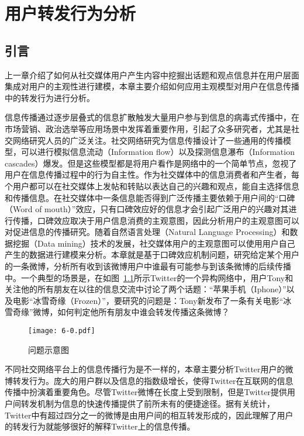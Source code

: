 \chapter{用户转发行为分析}
\label{ch6}

\section{引言}
\label{ch6_intro}
上一章介绍了如何从社交媒体用户产生内容中挖掘出话题和观点信息并在用户层面集成对用户的主观性进行建模，本章主要介绍如何应用主观模型对用户在信息传播中的转发行为进行分析。

信息传播通过逐步层叠式的信息扩散触发大量用户参与到信息的病毒式传播中，在市场营销、政治选举等应用场景中发挥着重要作用，引起了众多研究者，尤其是社交网络研究人员的广泛关注。社交网络研究为信息传播设计了一些通用的传播模型，可以进行模拟信息流动（Information flow）以及探测信息瀑布（Information cascades）爆发。但是这些模型都是将用户看作是网络中的一个简单节点，忽视了用户在信息传播过程中的行为自主性。作为社交媒体中的信息消费者和产生者，每个用户都可以在社交媒体上发帖和转贴以表达自己的兴趣和观点，能自主选择信息和传播信息。在社交媒体中一条信息能否得到广泛传播主要依赖于用户间的“口碑（Word of mouth）”效应，只有口碑效应好的信息才会引起广泛用户的兴趣对其进行传播，口碑效应取决于用户信息消费的主观意图，因此分析用户的主观意图可以对促进信息的传播研究。随着自然语言处理（Natural Language Processing）和数据挖掘（Data mining）技术的发展，社交媒体用户的主观意图可以使用用户自己产生的数据进行建模来分析。本章就是基于口碑效应机制问题，研究给定某个用户的一条微博，分析所有收到该微博用户中谁最有可能参与到该条微博的后续传播中。一个典型的场景是，在如图~\ref{fig6-0}所示Twitter的一个异构网络中，用户Tony和关注他的所有朋友在以往的信息交流中讨论了两个话题：“苹果手机（Iphone）”以及电影“冰雪奇缘（Frozen）”，要研究的问题是：Tony新发布了一条有关电影“冰雪奇缘”微博，如何判定他所有朋友中谁会转发传播这条微博？

\begin{figure}[htb]
\centering
\texttt{[image: 6-0.pdf]}
\caption{问题示意图}
\label{fig6-0}
\end{figure}

不同社交网络平台上的信息传播行为是不一样的，本章主要分析Twitter用户的微博转发行为。庞大的用户群以及信息的指数级增长，使得Twitter在互联网的信息传播中扮演着重要角色。尽管Twitter微博在长度上受到限制，但是Twitter提供用户间转发机制为信息的快速传播提供了前所未有的便捷途径。据有关统计，Twitter中有超过四分之一的微博是由用户间的相互转发形成的，因此理解了用户的转发行为就能够很好的解释Twitter上的信息传播。

